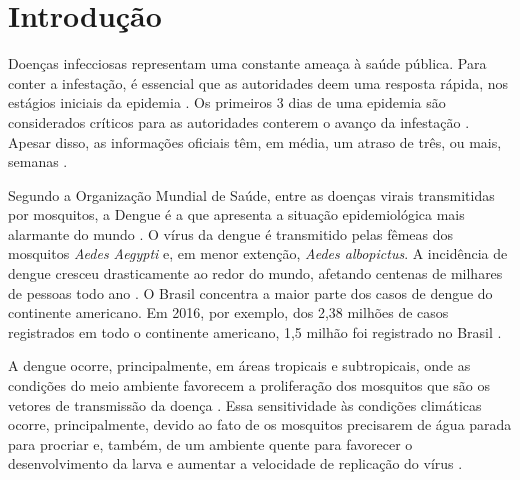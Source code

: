 \documentclass[12pt,openright,twoside,a4paper,article,brazil]{abntex2}
\begin{document}
\frontmatter


\maketitle

\tableofcontents

\newpage

\mainmatter



\section{Introdução}
\label{sec:introducao}

Doenças infecciosas representam uma constante ameaça à saúde pública. Para conter a infestação, é essencial que as autoridades deem uma resposta rápida, nos estágios iniciais da epidemia \cite{social-surveillance}. Os primeiros 3 dias de uma epidemia são considerados críticos para as autoridades conterem o avanço da infestação \cite{internet-surveillance}. Apesar disso, as informações oficiais têm, em média, um atraso de três, ou mais, semanas \cite{forecasting-zika}.

Segundo a Organização Mundial de Saúde, entre as doenças virais transmitidas por mosquitos, a Dengue é a que apresenta a situação epidemiológica mais alarmante do mundo \cite{who-strategy-dengue-prevention}. O vírus da dengue é transmitido pelas fêmeas dos mosquitos \emph{Aedes Aegypti} e, em menor extenção, \emph{Aedes albopictus}. A incidência de dengue cresceu drasticamente ao redor do mundo, afetando centenas de milhares de pessoas todo ano \cite{who-dengue-website}. O Brasil concentra a maior parte dos casos de dengue do continente americano. Em 2016, por exemplo, dos 2,38 milhões de casos registrados em todo o continente americano, 1,5 milhão foi registrado no Brasil \cite{who-dengue-website}.

A dengue ocorre, principalmente, em áreas tropicais e subtropicais, onde as condições do meio ambiente favorecem a proliferação dos mosquitos que são os vetores de transmissão da doença \cite{ms-descricao-doenca}. Essa sensitividade às condições climáticas ocorre, principalmente, devido ao fato de os mosquitos precisarem de água parada para procriar e, também, de um ambiente quente para favorecer o desenvolvimento da larva e aumentar a velocidade de replicação do vírus \cite{effect-climate-dengue}.
\end{document}
